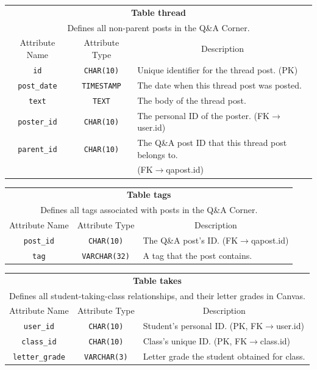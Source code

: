 \documentclass{paper}
\begin{document}
\begin{center}
		\begin{tabular}{c | c | l}
			\toprule
			\multicolumn{3}{c}{\textbf{Table thread}} \\
			\multicolumn{3}{c}{Defines all non-parent posts in the Q\&A Corner.}\\
			\midrule
			Attribute Name & Attribute Type & \multicolumn{1}{c}{Description} \\
			\verb|id| & \verb|CHAR(10)| & Unique identifier for the thread post. (PK) \\
			\verb|post_date| & \verb|TIMESTAMP| & The date when this thread post was posted.\\
			\verb|text| & \verb|TEXT| & The body of the thread post.\\
			\verb|poster_id| & \verb|CHAR(10)| & The personal ID of the poster. (FK$\to$user.id)\\
			\verb|parent_id| & \verb|CHAR(10)| & The Q\&A post ID that this thread post belongs to.\\
			& & (FK$\to$qapost.id)\\
			\bottomrule
		\end{tabular}\vspace{1.5em}
			
		\begin{tabular}{c | c | l}
			\toprule
			\multicolumn{3}{c}{\textbf{Table tags}} \\
			\multicolumn{3}{c}{Defines all tags associated with posts in the Q\&A Corner.}\\
			\midrule
			Attribute Name & Attribute Type & \multicolumn{1}{c}{Description} \\
			\verb|post_id| & \verb|CHAR(10)| & The Q\&A post's ID. (FK$\to$qapost.id)\\
			\verb|tag| & \verb|VARCHAR(32)| & A tag that the post contains.\\
			\bottomrule
		\end{tabular}\vspace{1.5em}
			
		\begin{tabular}{c | c | l}
			\toprule
			\multicolumn{3}{c}{\textbf{Table takes}} \\
			\multicolumn{3}{c}{Defines all student-taking-class relationships, and their letter grades in Canvas.}\\
			\midrule
			Attribute Name & Attribute Type & \multicolumn{1}{c}{Description} \\
			\verb|user_id| & \verb|CHAR(10)| & Student's personal ID. (PK, FK$\to$user.id) \\
			\verb|class_id| & \verb|CHAR(10)| & Class's unique ID. (PK, FK$\to$class.id) \\
			\verb|letter_grade| & \verb|VARCHAR(3)| & Letter grade the student obtained for class.\\
			\bottomrule
		\end{tabular}\vspace{1.5em}
			

\end{center}
\end{document}
